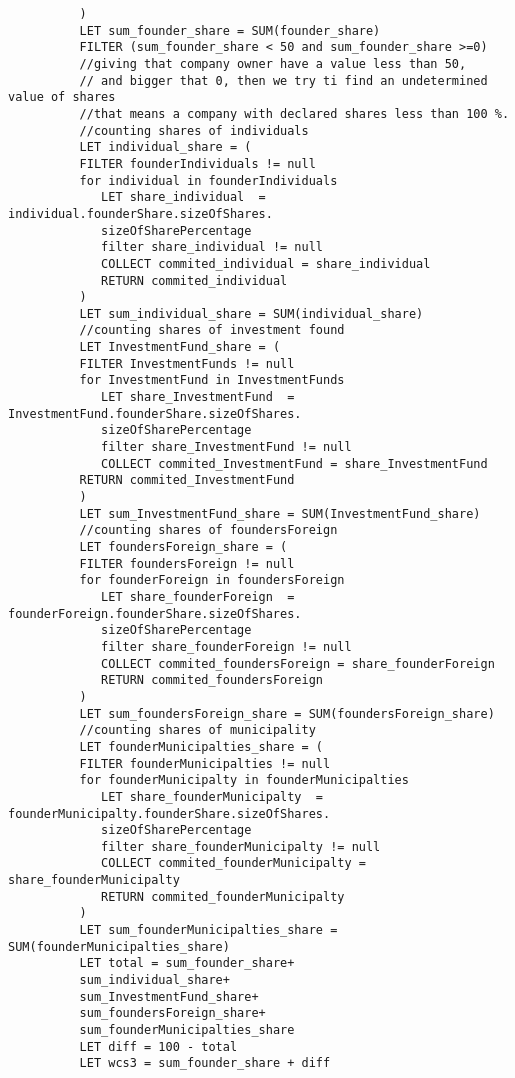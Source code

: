 \begin{enumerate}
\begin{verbatim}
	      )
	      LET sum_founder_share = SUM(founder_share)
	      FILTER (sum_founder_share < 50 and sum_founder_share >=0)
	      //giving that company owner have a value less than 50, 
	      // and bigger that 0, then we try ti find an undetermined value of shares
	      //that means a company with declared shares less than 100 %. 
	      //counting shares of individuals
	      LET individual_share = (
	      FILTER founderIndividuals != null
	      for individual in founderIndividuals
	         LET share_individual  = individual.founderShare.sizeOfShares.
	         sizeOfSharePercentage
	         filter share_individual != null
	         COLLECT commited_individual = share_individual
	         RETURN commited_individual
	      )
	      LET sum_individual_share = SUM(individual_share)
	      //counting shares of investment found
	      LET InvestmentFund_share = (
	      FILTER InvestmentFunds != null
	      for InvestmentFund in InvestmentFunds
	         LET share_InvestmentFund  = InvestmentFund.founderShare.sizeOfShares.
	         sizeOfSharePercentage
	         filter share_InvestmentFund != null
	         COLLECT commited_InvestmentFund = share_InvestmentFund
	      RETURN commited_InvestmentFund
	      )
	      LET sum_InvestmentFund_share = SUM(InvestmentFund_share)
	      //counting shares of foundersForeign
	      LET foundersForeign_share = (
	      FILTER foundersForeign != null
	      for founderForeign in foundersForeign
	         LET share_founderForeign  = founderForeign.founderShare.sizeOfShares.
	         sizeOfSharePercentage
	         filter share_founderForeign != null
	         COLLECT commited_foundersForeign = share_founderForeign
	         RETURN commited_foundersForeign
	      )
	      LET sum_foundersForeign_share = SUM(foundersForeign_share)
	      //counting shares of municipality
	      LET founderMunicipalties_share = (
	      FILTER founderMunicipalties != null
	      for founderMunicipalty in founderMunicipalties
	         LET share_founderMunicipalty  = founderMunicipalty.founderShare.sizeOfShares.
	         sizeOfSharePercentage
	         filter share_founderMunicipalty != null
	         COLLECT commited_founderMunicipalty = share_founderMunicipalty
	         RETURN commited_founderMunicipalty
	      )
	      LET sum_founderMunicipalties_share = SUM(founderMunicipalties_share)
	      LET total = sum_founder_share+
	      sum_individual_share+
	      sum_InvestmentFund_share+
	      sum_foundersForeign_share+
	      sum_founderMunicipalties_share
	      LET diff = 100 - total
	      LET wcs3 = sum_founder_share + diff

\end{verbatim}
\end{enumerate}
